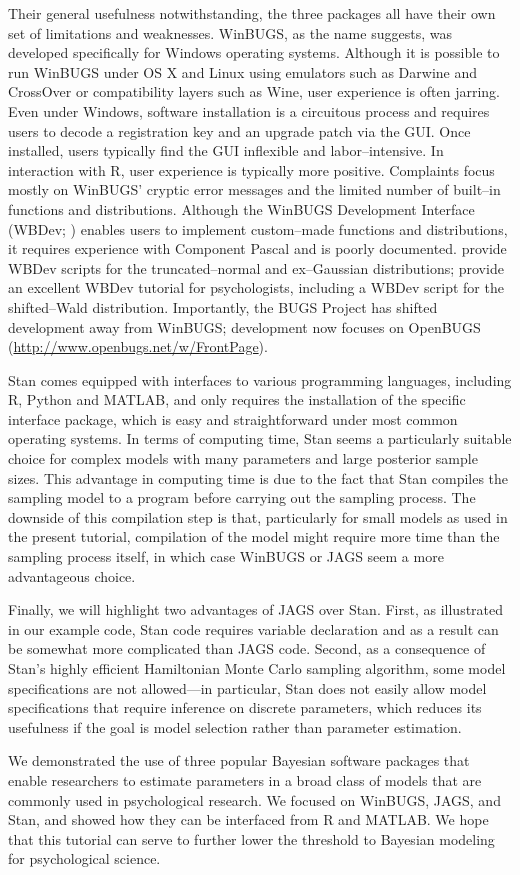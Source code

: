 {Their general usefulness notwithstanding, the three packages all have their own set of limitations and weaknesses. WinBUGS, as the name suggests, was developed specifically for Windows operating systems. Although it is possible to run WinBUGS under OS X and Linux using emulators such as Darwine and CrossOver or compatibility layers such as Wine, user experience is often jarring. Even under Windows, software installation is a circuitous process and requires users to decode a registration key and an upgrade patch via the GUI. Once installed, users typically find the GUI inflexible and labor--intensive. In interaction with R, user experience is typically more positive. Complaints focus mostly on WinBUGS' cryptic error messages and the limited number of built--in functions and distributions. Although the WinBUGS Development Interface (WBDev; ) enables users to implement custom--made functions and distributions, it requires experience with Component Pascal and is poorly documented.  provide WBDev scripts for the truncated--normal and ex--Gaussian distributions;  provide an excellent WBDev tutorial for psychologists, including a WBDev script for the shifted--Wald distribution. Importantly, the BUGS Project has shifted development away from WinBUGS; development now focuses on OpenBUGS (\url{http://www.openbugs.net/w/FrontPage}).}

{Stan comes equipped with interfaces to various programming languages, including R, Python and MATLAB, and only requires the installation of the specific interface package, which is easy and straightforward under most common operating systems. In terms of computing time, Stan seems a particularly suitable choice for complex models with many parameters and large posterior sample sizes. This advantage in computing time is due to the fact that Stan compiles the sampling model to a  program before carrying out the sampling process. The downside of this compilation step is that, particularly for small models as used in the present tutorial, compilation of the model might require more time than the sampling process itself, in which case WinBUGS or JAGS seem a more advantageous choice.}

{Finally, we will highlight two advantages of JAGS over Stan. First, as illustrated in our example code, Stan code requires variable declaration and as a result can be somewhat more complicated than JAGS code. Second, as a consequence of Stan's highly efficient Hamiltonian Monte Carlo sampling algorithm, some model specifications are not allowed---in particular, Stan does not easily allow model specifications that require inference on discrete parameters, which reduces its usefulness if the goal is model selection rather than parameter estimation.}

{We demonstrated the use of three popular Bayesian software packages that enable researchers to estimate parameters in a broad class of models that are commonly used in psychological research. We focused on WinBUGS, JAGS, and Stan, and showed how they can be interfaced from R and MATLAB. We hope that this tutorial can serve to further lower the threshold to Bayesian modeling for psychological science.}



